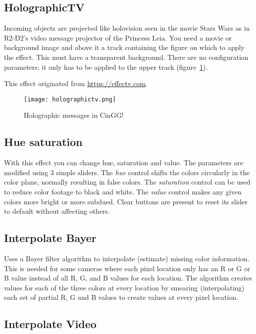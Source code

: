\subsection{HolographicTV}%
\label{sub:holographictv}

Incoming objects are projected like holovision seen in the movie Stars Wars as in R2-D2's video message projector of the Princess Leia. You need a movie or background image and above it a track containing the figure on which to apply the effect. This must have a transparent background. There are no configuration parameters; it only has to be applied to the upper track (figure~\ref{fig:holographictv}).

This effect originated from {\small \url{https://effectv.com}}.

\begin{figure}[htpb]
    \centering
    \texttt{[image: holographictv.png]}
    \caption{Holographic messages in CinGG!}
    \label{fig:holographictv}
\end{figure}

\subsection{Hue saturation}%
\label{sub:hue_saturation}

With this effect you can change hue, saturation and value. The parameters are modified using 3 simple sliders. The \textit{hue} control shifts the colors circularly in the color plane, normally resulting in false colors. The \textit{saturation} control can be used to reduce color footage to black and white. The \textit{value} control makes any given colors more bright or more subdued. Clear buttons are present to reset its slider to default without affecting others.

\subsection{Interpolate Bayer}%
\label{sub:interpolate_bayer}

Uses a Bayer filter algorithm to interpolate (estimate) missing color information. This is needed for some cameras where each pixel location only has an R or G or B value instead of all R, G, and B values for each location. The algorithm creates values for each of the three colors at every location by smearing (interpolating) each set of partial R, G and B values to create values at every pixel location.

\subsection{Interpolate Video}%
\label{sub:interpolate_video}

